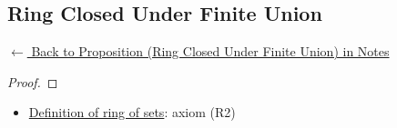 
\subsection*{Ring Closed Under Finite Union}
\label{prf:ring-closed-finite-union}

\begin{remark*}[Return]
\hyperref[prop:ring-closed-finite-union]{$\leftarrow$ Back to Proposition (Ring Closed Under Finite Union) in Notes}
\end{remark*}

\begin{proof}
\end{proof}

\begin{remark*}

\end{remark*}

\begin{remark*}[Dependencies]
\begin{itemize}
  \item \hyperref[def:ring-of-sets]{Definition of ring of sets}: axiom (R2)
\end{itemize}

\end{remark*}
